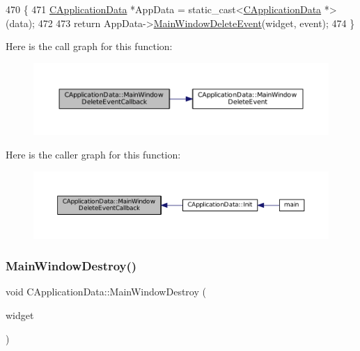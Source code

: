 \begin{DoxyCode}
470                                                                                                          \{
471     \hyperlink{classCApplicationData}{CApplicationData} *AppData = \textcolor{keyword}{static\_cast<}\hyperlink{classCApplicationData}{CApplicationData} *\textcolor{keyword}{>}(data);
472 
473     \textcolor{keywordflow}{return} AppData->\hyperlink{classCApplicationData_afd73780d7dca117edbe341cb3c908c04}{MainWindowDeleteEvent}(widget, event);
474 \}
\end{DoxyCode}
Here is the call graph for this function\+:
\nopagebreak
\begin{figure}[H]
\begin{center}
\leavevmode
\includegraphics[width=350pt]{classCApplicationData_a4b2110c03e030cf11b733955963f8854_cgraph}
\end{center}
\end{figure}
Here is the caller graph for this function\+:
\nopagebreak
\begin{figure}[H]
\begin{center}
\leavevmode
\includegraphics[width=350pt]{classCApplicationData_a4b2110c03e030cf11b733955963f8854_icgraph}
\end{center}
\end{figure}
\hypertarget{classCApplicationData_a202437b2380956a5519722937cd9f96a}{}\label{classCApplicationData_a202437b2380956a5519722937cd9f96a} 
\subsubsection{\texorpdfstring{Main\+Window\+Destroy()}{MainWindowDestroy()}}
{\footnotesize\ttfamily void C\+Application\+Data\+::\+Main\+Window\+Destroy (\begin{DoxyParamCaption}\item[{Gtk\+Widget $\ast$}]{widget }\end{DoxyParamCaption})\hspace{0.3cm}{\ttfamily [protected]}}



